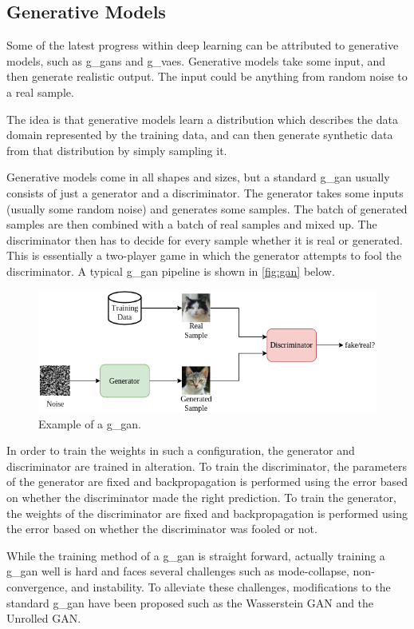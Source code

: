 \subsection{Generative Models}
Some of the latest progress within deep learning can be attributed to generative models, such as \glspl*{g_gan}\cite{gan} and \glspl*{g_vae}\cite{vae}. Generative models take some input, and then generate realistic output. The input could be anything from random noise to a real sample.
\par
The idea is that generative models learn a distribution which describes the data domain represented by the training data, and can then generate synthetic data from that distribution by simply sampling it.
\par
Generative models come in all shapes and sizes, but a standard \gls*{g_gan} usually consists of just a generator and a discriminator. The generator takes some inputs (usually some random noise) and generates some samples. The batch of generated samples are then combined with a batch of real samples and mixed up. The discriminator then has to decide for every sample whether it is real or generated. This is essentially a two-player game in which the generator attempts to fool the discriminator. A typical \gls*{g_gan} pipeline is shown in \autoref{fig:gan} below.
\begin{figure}[H]
    \centering
    \includegraphics[width=\linewidth]{resources/related_works/gan.png}
    \caption{Example of a \gls*{g_gan}.}
    \label{fig:gan}
\end{figure}
In order to train the weights in such a configuration, the generator and discriminator are trained in alteration. To train the discriminator, the parameters of the generator are fixed and backpropagation is performed using the error based on whether the discriminator made the right prediction. To train the generator, the weights of the discriminator are fixed and backpropagation is performed using the error based on whether the discriminator was fooled or not.
\par
While the training method of a \gls*{g_gan} is straight forward, actually training a \gls*{g_gan} well is hard and faces several challenges such as mode-collapse, non-convergence, and instability\cite{gan_challenges,gan_challenges2}. To alleviate these challenges, modifications to the standard \gls*{g_gan} have been proposed such as the Wasserstein GAN\cite{wgan} and the Unrolled GAN\cite{unrolled_gan}.

